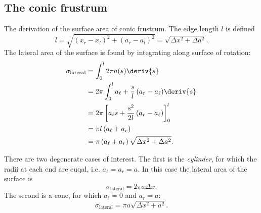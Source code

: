 \subsection{The conic frustrum}
The derivation of the surface area of conic frustrum.
The edge length $l$ is defined
\begin{equation}
    l = \sqrt{(x_r - x_l)^2 + (a_r - a_l)^2} = \sqrt{\Delta x^2 + \Delta a^2}.
\end{equation}
The lateral area of the surface is found by integrating along surface of rotation:
\begin{align}
    \sigma_{\text{lateral}}
        &= \int_{0}^{l} {2\pi a(s)} \deriv{s} \nonumber \\
        &= 2\pi \int_{0}^{l} {a_{\ell} + \frac{s}{l}\left( a_r - a_\ell \right)} \deriv{s} \nonumber \\
        &= 2\pi \left[ a_{\ell}s + \frac{s^2}{2l}\left( a_r - a_\ell \right) \right]_0^l \nonumber \\
        &= \pi l \left( a_{\ell} + a_r \right) \nonumber \\
        &= \pi \left( a_{\ell} + a_r \right) \sqrt{\Delta x^2 + \Delta a^2}. \label{eq:frustrum_area}
\end{align}

There are two degenerate cases of interest. The first is the \emph{cylinder}, for which the radii at each end are euqal, i.e. $a_\ell = a_r = a$. In this case the lateral area of the surface is
\begin{equation}
    \sigma_{\text{lateral}} = 2\pi a \Delta x.
\end{equation}
The second is a cone, for which $a_\ell=0$ and $a_r=a$:
\begin{equation}
    \sigma_{\text{lateral}} = \pi a \sqrt{\Delta x^2 + a^2}.
\end{equation}
